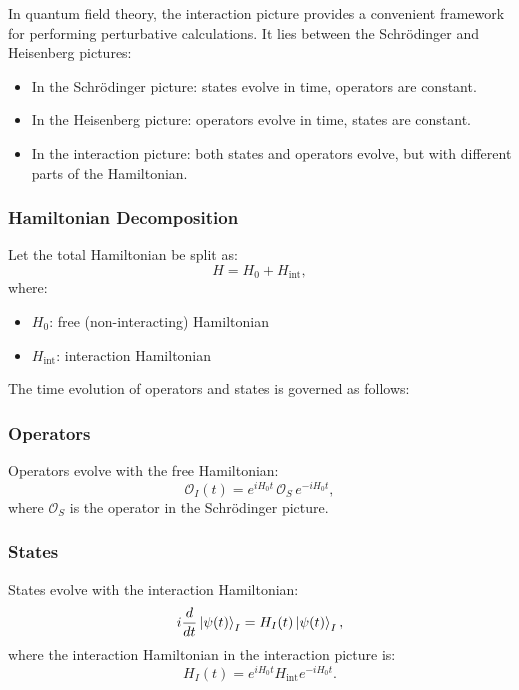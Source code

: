 \documentclass[a4paper,12pt]{article}
\begin{document}
In quantum field theory, the interaction picture provides a convenient framework for performing perturbative calculations. It lies between the Schrödinger and Heisenberg pictures:

\begin{itemize}
    \item In the Schrödinger picture: states evolve in time, operators are constant.
    \item In the Heisenberg picture: operators evolve in time, states are constant.
    \item In the interaction picture: both states and operators evolve, but with different parts of the Hamiltonian.
\end{itemize}

\subsubsection*{Hamiltonian Decomposition}

Let the total Hamiltonian be split as:
\begin{equation}
H = H_0 + H_{\text{int}},
\end{equation}
where:
\begin{itemize}
    \item $H_0$: free (non-interacting) Hamiltonian
    \item $H_{\text{int}}$: interaction Hamiltonian
\end{itemize}

The time evolution of operators and states is governed as follows:

\subsubsection*{Operators}

Operators evolve with the free Hamiltonian:
\begin{equation}
\mathcal{O}_I(t) = e^{i H_0 t} \, \mathcal{O}_S \, e^{-i H_0 t},
\end{equation}
where $\mathcal{O}_S$ is the operator in the Schrödinger picture.

\subsubsection*{States}

States evolve with the interaction Hamiltonian:
\begin{equation}
i \frac{d}{dt} \ket{\psi(t)}_I = H_I(t) \ket{\psi(t)}_I,
\end{equation}
where the interaction Hamiltonian in the interaction picture is:
\begin{equation}
H_I(t) = e^{i H_0 t} H_{\text{int}} e^{-i H_0 t}.
\end{equation}
\end{document}

